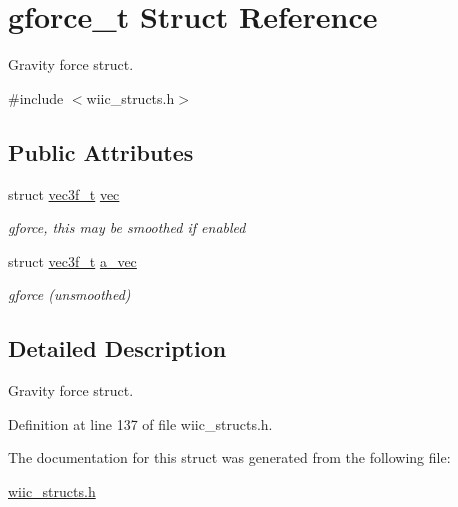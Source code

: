 \hypertarget{structgforce__t}{\section{gforce\-\_\-t \-Struct \-Reference}
\label{structgforce__t}
}


\-Gravity force struct.  




{\ttfamily \#include $<$wiic\-\_\-structs.\-h$>$}

\subsection*{\-Public \-Attributes}
\begin{DoxyCompactItemize}
\item 
\hypertarget{structgforce__t_a97f8ca8f50cd68fd5c5e9530758c461e}{struct \hyperlink{structvec3f__t}{vec3f\-\_\-t} \hyperlink{structgforce__t_a97f8ca8f50cd68fd5c5e9530758c461e}{vec}}\label{structgforce__t_a97f8ca8f50cd68fd5c5e9530758c461e}

\begin{DoxyCompactList}\small\item\em gforce, this may be smoothed if enabled \end{DoxyCompactList}\item 
\hypertarget{structgforce__t_a51f24cbec42c9cb0027c510eaa7c8f46}{struct \hyperlink{structvec3f__t}{vec3f\-\_\-t} \hyperlink{structgforce__t_a51f24cbec42c9cb0027c510eaa7c8f46}{a\-\_\-vec}}\label{structgforce__t_a51f24cbec42c9cb0027c510eaa7c8f46}

\begin{DoxyCompactList}\small\item\em gforce (unsmoothed) \end{DoxyCompactList}\end{DoxyCompactItemize}


\subsection{\-Detailed \-Description}
\-Gravity force struct. 

\-Definition at line 137 of file wiic\-\_\-structs.\-h.



\-The documentation for this struct was generated from the following file\-:\begin{DoxyCompactItemize}
\item 
\hyperlink{wiic__structs_8h}{wiic\-\_\-structs.\-h}\end{DoxyCompactItemize}
